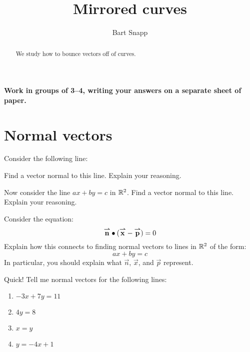 \documentclass[handout,noauthor,nooutcomes]{ximera}
\author{Bart Snapp}
\title[Collaborate:]{Mirrored curves}
\begin{document}
\begin{abstract}
  We study how to bounce vectors off of curves.
\end{abstract}
\maketitle

\textbf{Work in groups of 3--4, writing your answers on a separate
  sheet of paper.}

\section{Normal vectors}

\begin{problem}
Consider the following line:
\begin{image}
\end{image}
Find a vector normal to this line. Explain your reasoning.
\end{problem}

\begin{problem}
  Now consider the line $ax+by = c$ in $\mathbb R^2$. Find a vector normal to
  this line. Explain your reasoning.
\end{problem}

\begin{problem}
  Consider the equation:
  \[
  {\overset{\boldsymbol{\rightharpoonup}}{\mathbf{n}}}\bullet ({\overset{\boldsymbol{\rightharpoonup}}{\mathbf{x}}}-{\overset{\boldsymbol{\rightharpoonup}}{\mathbf{p}}}) = 0
  \]
  Explain how this connects to finding normal vectors to lines in
  $\mathbb R^2$ of the form:
  \[
  ax + by = c
  \]
  In particular, you should explain what $\vec{n}$, $\vec{x}$, and
  $\vec{p}$ represent.
\end{problem}


\begin{problem}
  Quick! Tell me normal vectors for the following lines:
  \begin{enumerate}
  \item $-3x+7y=11$
  \item $4y =8$
  \item $x=y$
  \item $y=-4x+1$
  \end{enumerate}
\end{problem}
\end{document}
